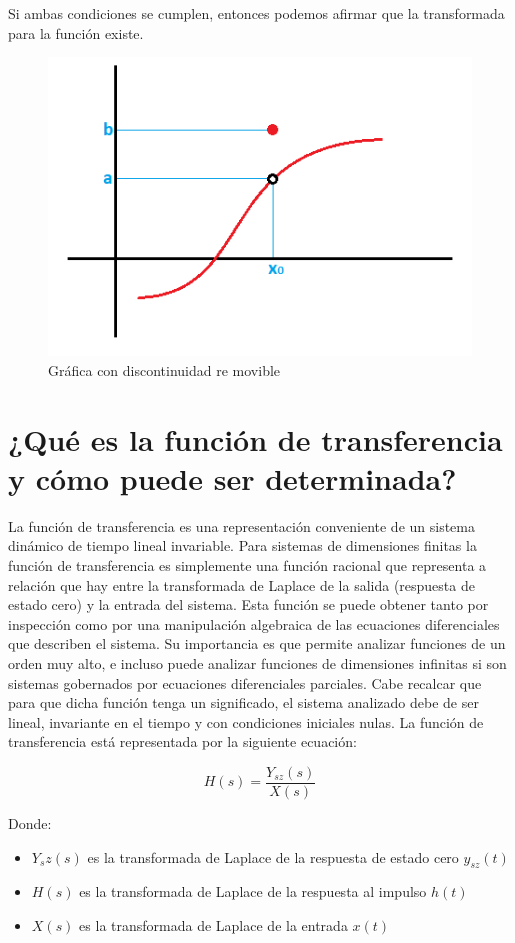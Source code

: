 Si ambas condiciones se cumplen, entonces podemos afirmar que la transformada para la función existe.

\begin{figure}[h]
	\centering
	\includegraphics[width=0.7\linewidth]{img/ilustracion_1}
	\caption{Gráfica con discontinuidad re movible}
	\label{fig:ilustracion1}
\end{figure}


\section{¿Qué es la función de transferencia y cómo puede ser determinada?}	
La función de transferencia es una representación conveniente de un sistema dinámico de tiempo lineal invariable. Para sistemas de dimensiones finitas la función de transferencia es simplemente una función racional que representa a relación que hay entre la transformada de Laplace de la salida (respuesta de estado cero) y la entrada del sistema. Esta función se puede obtener tanto por inspección como por una manipulación algebraica de las ecuaciones diferenciales que describen el sistema. Su importancia es que permite analizar funciones de un orden muy alto, e incluso puede analizar funciones de dimensiones infinitas si son sistemas gobernados por ecuaciones diferenciales parciales. Cabe recalcar que para que dicha función tenga un significado, el sistema analizado debe de ser lineal, invariante en el tiempo y con condiciones iniciales nulas. La función de transferencia está representada por la siguiente ecuación:

\begin{equation} 
	H(s)=\frac{Y_{sz}(s)}{X(s)}
\end{equation}

\noindent Donde:
\begin{itemize}
	\item $Y_sz(s)$ es la transformada de Laplace de la respuesta de estado cero $y_{sz}(t)$	
	\item $H(s)$ es la transformada de Laplace de la respuesta al impulso $h(t)$
	\item $X(s)$ es la transformada de Laplace de la entrada $x(t)$
\end{itemize}

